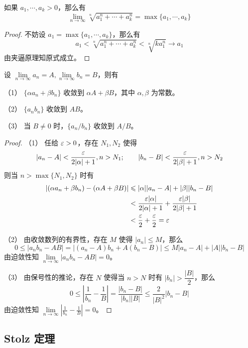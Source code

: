 \begin{example}
	如果 $a_1, \cdots, a_k > 0$，那么有
	\[ \lim_{n \to \infty} \sqrt[n]{a_1^n + \cdots + a_k^n} = \max\{a_1, \cdots, a_k\} \]
\end{example}

\begin{proof}
	不妨设 $a_1 = \max\{a_1, \cdots, a_k\}$，那么有
	\[ a_1 < \sqrt[n]{a_1^n + \cdots + a_k^n} < \sqrt[n]{k a_1^n} \to a_1 \]
	由夹逼原理知原式成立。
\end{proof}

\begin{theorem}[四则运算]
	设 $\lim\limits_{n\to \infty} a_n = A,\lim\limits_{n\to \infty} b_n = B$，则有

	（1） $\{\alpha a_n+\beta b_n\}$ 收敛到 $\alpha A+\beta B$，其中 $\alpha,\beta$ 为常数。

	（2） $\{a_nb_n\}$ 收敛到 $AB$。

	（3） 当 $B\ne 0$ 时，$\{a_n/b_n\}$ 收敛到 $A/B$。
\end{theorem}
\begin{proof}
	（1） 任给 $\varepsilon >0$，存在 $N_1,N_2$ 使得
	\[|a_n-A|<\frac{\varepsilon}{2|\alpha|+1},n>N_1;\qquad |b_n-B|<\frac{\varepsilon}{2|\beta|+1},n>N_2\]
	则当 $n>\max\{N_1,N_2\}$ 时有
	\[
		\begin{aligned}
			|(\alpha a_n+\beta b_n)-(\alpha A+\beta B)| & \leqslant |\alpha||a_n-A|+|\beta||b_n-B|                          \\
			                                            & < \frac{\varepsilon|\alpha|}{2|\alpha|+1}+\frac{\varepsilon|\beta|}{2|\beta|+1} \\
			                                            & < \frac{\varepsilon}2+\frac{\varepsilon}2=\varepsilon
		\end{aligned}
	\]

	（2） 由收敛数列的有界性，存在 $M$ 使得 $|a_n|\leqslant M$，那么
	\[0\leqslant |a_nb_n-AB|=|(a_n-A)b_n+A(b_n-B)|\leqslant M|a_n-A|+|A||b_n-B|\]
	由迫敛性知 $\lim\limits_{n\to \infty}|a_nb_n-AB| =0$。

	（3） 由保号性的推论，存在 $N$ 使得当 $n>N$ 时有 $|b_n|>\dfrac{|B|}{2}$，那么
	\[0 \leqslant \left|\frac{1}{b_n}-\frac{1}{B}\right| = \frac{|b_n-B|}{|b_n||B|} \leqslant \frac{2}{|B|^2}{|b_n-B|}\]
	由迫敛性知 $\lim\limits_{n\to \infty}\left|\frac{1}{b_n}-\frac{1}{B}\right| =0$。
\end{proof}

\subsection{Stolz 定理}


